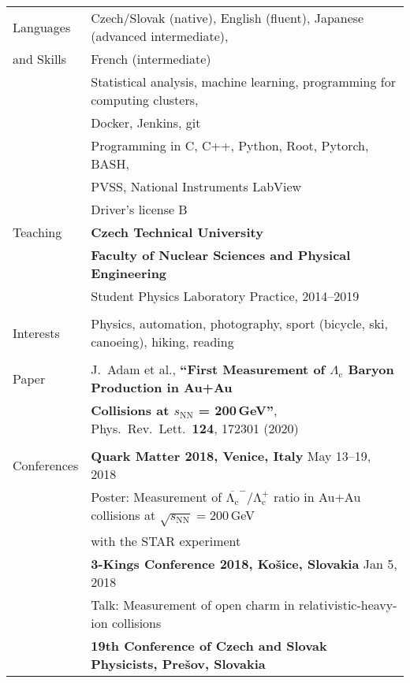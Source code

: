\documentclass[a4paper,11pt,oneside]{article}
\begin{document}
\newpage

\noindent  \begin{tabular}{@{} l l}
    \Large{Languages}   & Czech/Slovak (native), English (fluent), Japanese (advanced intermediate), \\
    \Large{and Skills}    & French (intermediate)  \\[.2cm]
        & Statistical analysis, machine learning, programming for computing clusters, \\
        & Docker, Jenkins, git\\[.2cm]
        & Programming in C, C++, Python, Root, Pytorch, BASH,  \\
        & PVSS, National Instruments LabView \\[.2cm]
        & Driver's license B\\[.3cm]
    \Large{Teaching}  & \textbf{Czech Technical University} \\
        & \textbf{Faculty of Nuclear Sciences and Physical Engineering} \\
        & Student Physics Laboratory Practice, 2014--2019\\
        \\
    \Large{Interests}    
        & Physics, automation, photography, sport (bicycle, ski, canoeing), hiking, reading \\
        \\
    \Large{Paper}
        & J.\ Adam et al., \textbf{``First Measurement of $\Lambda_\mathrm{c}$ Baryon Production in Au+Au} \\
        & \textbf{Collisions at $s_\mathrm{NN}$ = 200$\,$GeV''}, Phys.\ Rev.\ Lett.\ \textbf{124}, 172301 (2020) \\
        \\
    \Large{Conferences}
        & \textbf{Quark Matter 2018, Venice, Italy} May 13--19, 2018 \\
        & Poster: Measurement of $\mathrm{\overline{\Lambda_c}^-/\Lambda_c^+}$ ratio in Au+Au collisions at $\sqrt{s_\mathrm{NN}} = 200\,$GeV\\
        &with the STAR experiment \\[.2cm]
        & \textbf{3-Kings Conference 2018, Košice, Slovakia} Jan 5, 2018 \\
        & Talk: Measurement of open charm in relativistic-heavy-ion collisions \\[.2cm]
        & \textbf{19th Conference of Czech and Slovak Physicists, Prešov, Slovakia}\\

\end{tabular}
\end{document}
